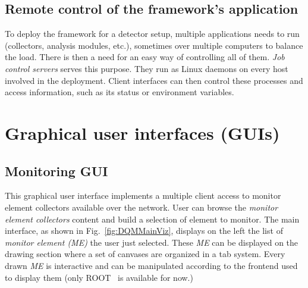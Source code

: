 \documentclass[conference]{IEEEtran}
\begin{document}
\subsection{Remote control of the framework's application}
To deploy the framework for a detector setup, multiple applications needs to run (collectors, analysis modules, etc.), sometimes over multiple computers to balance the load. There is then a need for an easy way of controlling all of them. \textit{Job control servers} serves this purpose. They run as Linux daemons on every host involved in the deployment. Client interfaces can then control these processes and access information, such as its status or environment variables.

\section{Graphical user interfaces (GUIs)}

\subsection{Monitoring GUI}

This graphical user interface implements a multiple client access to monitor element collectors available over the network. User can browse the \textit{monitor element collectors} content and build a selection of element to monitor. The main interface, as shown in Fig.~\ref{fig:DQMMainViz}, displays on the left the list of \textit{monitor element (ME)} the user just selected. These \textit{ME} can be displayed on the drawing section where a set of canvases are organized in a tab system. Every drawn \textit{ME} is interactive and can be manipulated according to the frontend used to display them (only ROOT~\cite{ROOT} is available for now.)
\end{document}
